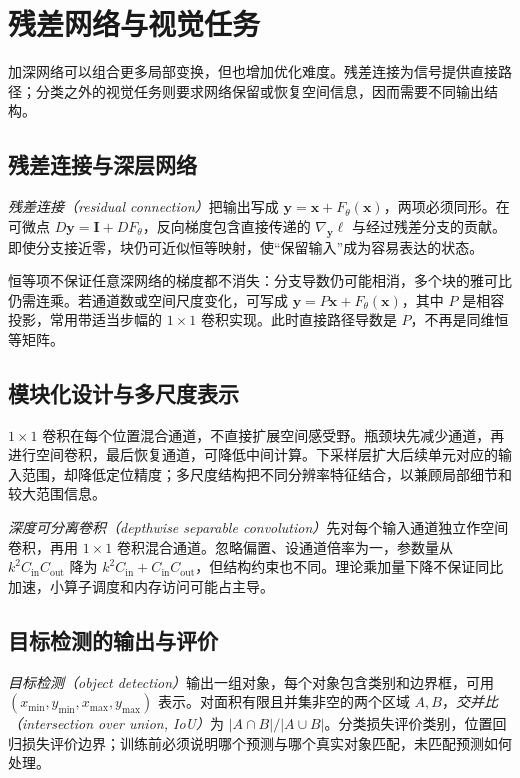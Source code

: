 \setcounter{chapter}{10} %
\chapter{残差网络与视觉任务}
\label{chap:dl-vision}
加深网络可以组合更多局部变换，但也增加优化难度。残差连接为信号提供直接路径；分类之外的视觉任务则要求网络保留或恢复空间信息，因而需要不同输出结构。

\section{残差连接与深层网络}
\emph{残差连接（residual connection）}把输出写成 $\mathbf y=\mathbf x+F_\theta(\mathbf x)$，两项必须同形。在可微点 $D\mathbf y=\mathbf I+DF_\theta$，反向梯度包含直接传递的 $\nabla_{\mathbf y}\ell$ 与经过残差分支的贡献。即使分支接近零，块仍可近似恒等映射，使“保留输入”成为容易表达的状态。

恒等项不保证任意深网络的梯度都不消失：分支导数仍可能相消，多个块的雅可比仍需连乘。若通道数或空间尺度变化，可写成 $\mathbf y=P\mathbf x+F_\theta(\mathbf x)$，其中 $P$ 是相容投影，常用带适当步幅的 $1\times1$ 卷积实现。此时直接路径导数是 $P$，不再是同维恒等矩阵。

\section{模块化设计与多尺度表示}
$1\times1$ 卷积在每个位置混合通道，不直接扩展空间感受野。瓶颈块先减少通道，再进行空间卷积，最后恢复通道，可降低中间计算。下采样层扩大后续单元对应的输入范围，却降低定位精度；多尺度结构把不同分辨率特征结合，以兼顾局部细节和较大范围信息。

\emph{深度可分离卷积（depthwise separable convolution）}先对每个输入通道独立作空间卷积，再用 $1\times1$ 卷积混合通道。忽略偏置、设通道倍率为一，参数量从 $k^2C_{\mathrm{in}}C_{\mathrm{out}}$ 降为 $k^2C_{\mathrm{in}}+C_{\mathrm{in}}C_{\mathrm{out}}$，但结构约束也不同。理论乘加量下降不保证同比加速，小算子调度和内存访问可能占主导。

\section{目标检测的输出与评价}
\emph{目标检测（object detection）}输出一组对象，每个对象包含类别和边界框，可用 $(x_{\min},y_{\min},x_{\max},y_{\max})$ 表示。对面积有限且并集非空的两个区域 $A,B$，\emph{交并比（intersection over union, IoU）}为 $|A\cap B|/|A\cup B|$。分类损失评价类别，位置回归损失评价边界；训练前必须说明哪个预测与哪个真实对象匹配，未匹配预测如何处理。

